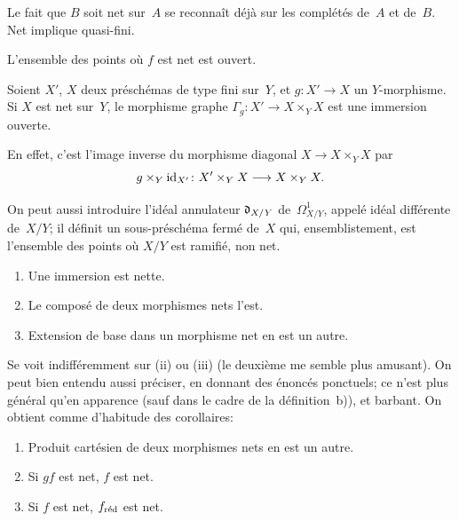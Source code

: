 \begin{remarquesstar}
Le fait
que $B$ soit net sur~$A$ se reconna\^it d\'ej\`a sur
les compl\'et\'es de~$A$ et de~$B$. Net implique quasi-fini.
\end{remarquesstar}

\begin{corollaire}
\label{I.3.3}
L'ensemble des points o\`u $f$ est net est ouvert.
\end{corollaire}

\begin{corollaire}
\label{I.3.4}
Soient $X'$, $X$ deux pr\'esch\'emas de type fini sur~$Y$, et
$g\colon X'\to X$ un $Y$-morphisme. Si $X$ est net sur~$Y$, le
morphisme graphe $\Gamma_g\colon X'\to X\times_Y X$ est une immersion
ouverte.
\end{corollaire}

En effet, c'est l'image inverse du morphisme diagonal $X\to X\times_Y
X$ par
$$
g\times_Y\id_{X'}\colon X'\times_Y X\to X\times_Y X.
$$

On peut aussi introduire l'id\'eal annulateur $\mathfrak{d}_{X/Y}$
\label{indnot:af}de~$\mathit{\Omega}^1_{X/Y}$, appel\'e id\'eal diff\'erente
de~$X/Y$; il d\'efinit un sous-pr\'esch\'ema ferm\'e de~$X$
qui, ensemblistement, est l'ensemble des points o\`u $X/Y$ est
ramifi\'e, \ie non net.

\begin{proposition}
\label{I.3.5}
\begin{enumerate}
\item[(i)] Une immersion est nette.
\item[(ii)] Le compos\'e de deux morphismes nets l'est.
\item[(iii)] Extension de base dans un morphisme net en est un autre.
\end{enumerate}
\end{proposition}

Se voit indiff\'eremment sur (ii) ou (iii) (le deuxi\`eme me
semble plus amusant). On peut bien entendu aussi pr\'eciser, en
donnant des \'enonc\'es ponctuels; ce n'est plus g\'en\'eral
qu'en apparence (sauf dans le cadre de la d\'efinition~b)), et
barbant. On obtient comme d'habitude des corollaires:

\begin{corollaires}
\label{I.3.6}
\begin{enumerate}
\item[(iv)] Produit cart\'esien de deux morphismes nets en est un
autre.
\item[(v)] Si $gf$ est net, $f$ est net.
\item[(vi)] Si $f$ est net, $f_{\text{\textup{réd}}}$ est net.
\end{enumerate}
\end{corollaires}

